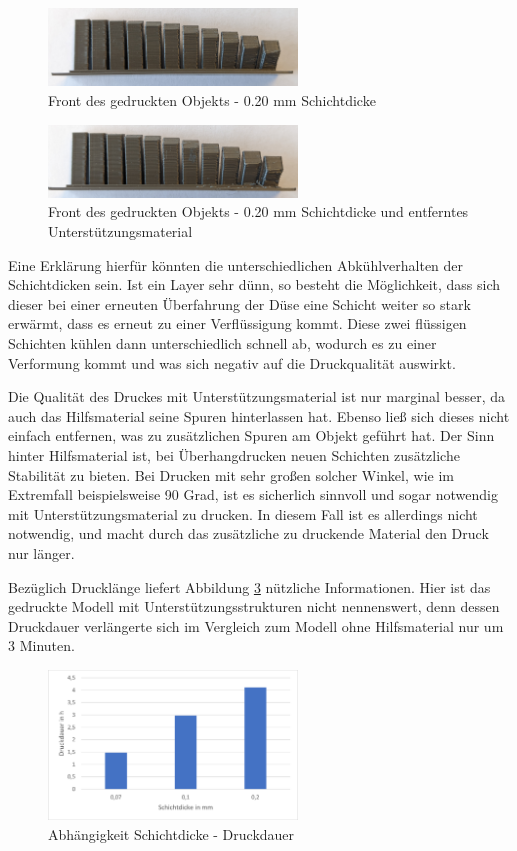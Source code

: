 \documentclass[a4paper,12pt,bibtotocnumbered]{scrartcl}
\numberwithin{equation}{section} %
\begin{document}
\begin{figure}[H]
\centerline{\includegraphics[width=250px]{./images/020.jpg}}
\caption{Front des gedruckten Objekts - 0.20 mm Schichtdicke}
\label{druck3}
\end{figure}

\begin{figure}[H]
\centerline{\includegraphics[width=250px]{./images/020_sup.jpg}}
\caption{Front des gedruckten Objekts - 0.20 mm Schichtdicke und entferntes Unterstützungsmaterial}
\label{druck4}
\end{figure}

Eine Erklärung hierfür könnten die unterschiedlichen Abkühlverhalten der Schichtdicken sein. Ist ein Layer sehr dünn, so besteht die Möglichkeit, dass sich dieser bei einer erneuten Überfahrung der Düse eine Schicht weiter so stark erwärmt, dass es erneut zu einer Verflüssigung kommt. Diese zwei flüssigen Schichten kühlen dann unterschiedlich schnell ab, wodurch es zu einer Verformung kommt und was sich negativ auf die Druckqualität auswirkt.

Die Qualität des Druckes mit Unterstützungsmaterial ist nur marginal besser, da auch das Hilfsmaterial seine Spuren hinterlassen hat. Ebenso ließ sich dieses nicht einfach entfernen, was zu zusätzlichen Spuren am Objekt geführt hat. Der Sinn hinter Hilfsmaterial ist, bei Überhangdrucken neuen Schichten zusätzliche Stabilität zu bieten. Bei Drucken mit sehr großen solcher Winkel, wie im Extremfall beispielsweise 90 Grad, ist es sicherlich sinnvoll und sogar notwendig mit Unterstützungsmaterial zu drucken. In diesem Fall ist es allerdings nicht notwendig, und macht durch das zusätzliche zu druckende Material den Druck nur länger.

Bezüglich Drucklänge liefert Abbildung \ref*{print_duration} nützliche Informationen. Hier ist das gedruckte Modell mit Unterstützungsstrukturen nicht nennenswert, denn dessen Druckdauer verlängerte sich im Vergleich zum Modell ohne Hilfsmaterial nur um 3 Minuten.


\begin{figure}[H]
	\centerline{\includegraphics[width=250px]{./images/dauer.png}}
	\caption{Abhängigkeit Schichtdicke - Druckdauer}
	\label{print_duration}
	\end{figure}
\end{document}
